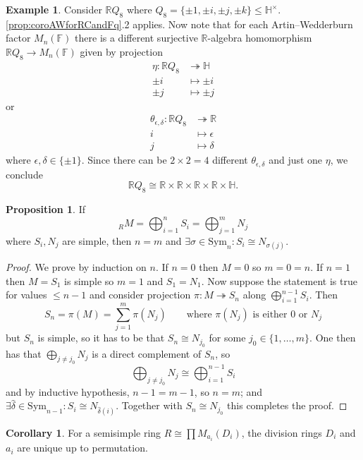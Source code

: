 \documentclass[a4paper]{article}
\newcommand{\F}{\mathbb{F}}
\newcommand{\R}{\mathbb{R}}
\newcommand{\Hq}{\mathbb{H}}
\theoremstyle{definition}
\newtheorem{prop}[defn]{Proposition}
\newtheorem{coro}[defn]{Corollary}
\newtheorem{example}[defn]{Example}
\begin{document}
\begin{example}
Consider $\R Q_8$ where $Q_8=\{\pm 1,\pm i,\pm j,\pm k\}\leq\Hq^\times$. \ref{prop:coroAWforRCandFq}.2 applies. Now note that for each Artin–Wedderburn factor $M_n(\F)$ there is a different surjective $\R$-algebra homomorphism $\R Q_8\rightarrow M_n(\F)$ given by projection
\[
\begin{aligned}
\eta:\R Q_8&\twoheadrightarrow\Hq\\
\pm i&\mapsto\pm i\\
\pm j&\mapsto\pm j
\end{aligned}
\]
or
\[
\begin{aligned}
\theta_{\epsilon,\delta}:\R Q_8&\twoheadrightarrow\R\\
i&\mapsto\epsilon\\
j&\mapsto\delta
\end{aligned}
\]
where $\epsilon,\delta\in\{\pm 1\}$. Since there can be $2\times 2=4$ different $\theta_{\epsilon,\delta}$ and just one $\eta$, we conclude
\[
\R Q_8\cong\R\times\R\times\R\times\R\times\Hq.
\]
\end{example}

\begin{prop}
If
\[
_RM=\bigoplus_{i=1}^n S_i=\bigoplus_{j=1}^m N_j
\]
where $S_i,N_j$ are simple, then $n=m$ and $\exists\sigma\in \text{Sym}_n:S_i\cong N_{\sigma(j)}$.
\end{prop}
\begin{proof}
We prove by induction on $n$. If $n=0$ then $M=0$ so $m=0=n$. If $n=1$ then $M=S_1$ is simple so $m=1$ and $S_1=N_1$. Now suppose the statement is true for values $\leq n-1$ and consider projection $\pi:M\twoheadrightarrow S_n$ along $\bigoplus_{i=1}^{n-1}S_i$. Then
\[
S_n=\pi(M)=\sum_{j=1}^m \pi(N_j) \qquad\text{where }\pi(N_j)\text{ is either 0 or } N_j
\]
but $S_n$ is simple, so it has to be that $S_n\cong N_{j_0}$ for some $j_0\in\{1,\ldots,m\}$. One then has that $\bigoplus_{j\neq j_0} N_j$ is a direct complement of $S_n$, so
\[
\bigoplus_{j\neq j_0}N_j\cong\bigoplus_{i=1}^{n-1}S_i
\]
and by inductive hypothesis, $n-1=m-1$, so $n=m$; and $\exists\widehat\delta\in\text{Sym}_{n-1}:S_i\cong N_{\widehat\delta(i)}$. Together with $S_n\cong N_{j_0}$ this completes the proof.
\end{proof}

\begin{coro}
For a semisimple ring $R\cong\prod M_{a_i}(D_i)$, the division rings $D_i$ and $a_i$ are unique up to permutation.
\end{coro}
\end{document}
